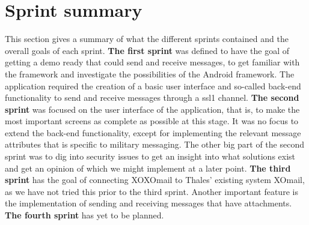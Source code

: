 \section{Sprint summary}

This section gives a summary of what the different sprints contained and the overall goals of each sprint. 
\newline
\newline
\textbf{The first sprint} was defined to have the goal of getting a demo ready that could send and receive messages, to get familiar with the framework and investigate the possibilities of the Android framework. The application required the creation of a basic user interface and so-called back-end functionality to send and receive messages through a \gls{ssl1} channel. 
\newline
\newline
\textbf{The second sprint} was focused on the user interface of the application, that is, to make the most important screens as complete as possible at this stage. It was no focus to extend the back-end functionality, except for implementing the relevant message attributes that is specific to military messaging. The other big part of the second sprint was to dig into security issues to get an insight into what solutions exist and get an opinion of which we might implement at a later point.
\newline
\newline
\textbf{The third sprint} has the goal of connecting XOXOmail to Thales’ existing system XOmail, as we have not tried this prior to the third sprint. Another important feature is the implementation of sending and receiving messages that have attachments.
\newline
\newline
\textbf{The fourth sprint} has yet to be planned.